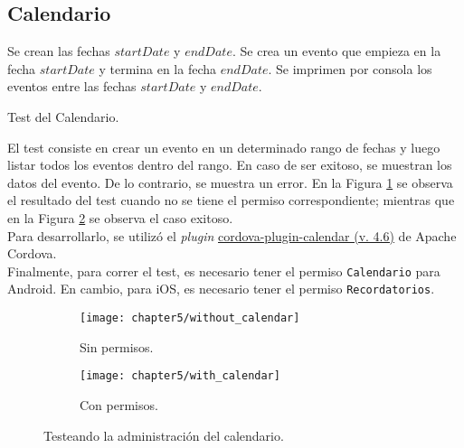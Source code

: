 \subsection{Calendario}
\begin{algorithm}
	\begin{algorithmic}[1]
		\STATE Se crean las fechas $startDate$ y $endDate$.
		\STATE Se crea un evento que empieza en la fecha $startDate$ y termina en la fecha $endDate$.
		\STATE Se imprimen por consola los eventos entre las fechas $startDate$ y $endDate$.
	\end{algorithmic}
	\caption{Test del Calendario.}\label{alg:chap5:test_calendario}
\end{algorithm}
El test consiste en crear un evento en un determinado rango de fechas y luego listar todos los eventos dentro del rango. En caso de ser exitoso, se muestran los datos del evento. De lo contrario, se muestra un error. En la Figura \ref{fig:ch05:without_calendar} se observa el resultado del test cuando no se tiene el permiso correspondiente; mientras que en la Figura \ref{fig:ch05:with_calendar} se observa el caso exitoso.\\

Para desarrollarlo, se utilizó el \textit{plugin} \href{https://www.npmjs.com/package/cordova-plugin-calendar}{cordova-plugin-calendar (v. 4.6)} de Apache Cordova.\\

Finalmente, para correr el test, es necesario tener el permiso \texttt{Calendario} para Android. En cambio, para iOS, es necesario tener el permiso \texttt{Recordatorios}.
\begin{figure}[tp]
    \centering
    \begin{subfigure}{0.3\linewidth}
        \texttt{[image: chapter5/without\_calendar]}
        \caption{Sin permisos.}
        \label{fig:ch05:without_calendar}
    \end{subfigure}
    \begin{subfigure}{0.3\linewidth}
        \texttt{[image: chapter5/with\_calendar]}
        \caption{Con permisos.}
        \label{fig:ch05:with_calendar}
    \end{subfigure}
    \caption{Testeando la administración del calendario.}
	\label{fig:ch05:calendar-cases}
\end{figure}
\newpage
